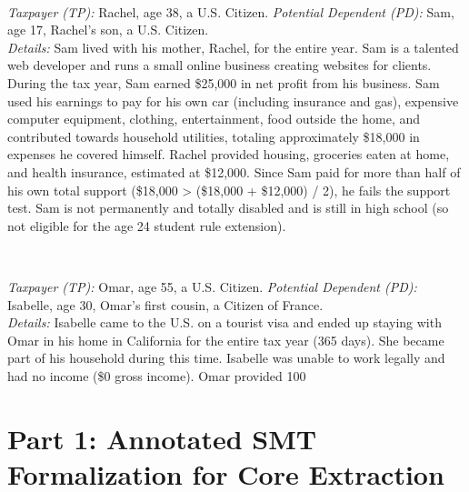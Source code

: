\documentclass[11pt, letterpaper]{article}
\begin{document}
\begin{description}[style=unboxed, leftmargin=0pt]
    \item[Scenario ND2 (Non-Dependent - Fails QC Support, Fails QR)] \mbox{} \\ \begin{RaggedRight}
    \textit{Taxpayer (TP):} Rachel, age 38, a U.S. Citizen.
    \textit{Potential Dependent (PD):} Sam, age 17, Rachel's son, a U.S. Citizen. \\
    \textit{Details:} Sam lived with his mother, Rachel, for the entire year. Sam is a talented web developer and runs a small online business creating websites for clients. During the tax year, Sam earned \$25,000 in net profit from his business. Sam used his earnings to pay for his own car (including insurance and gas), expensive computer equipment, clothing, entertainment, food outside the home, and contributed towards household utilities, totaling approximately \$18,000 in expenses he covered himself. Rachel provided housing, groceries eaten at home, and health insurance, estimated at \$12,000. Since Sam paid for more than half of his own total support (\$18,000 > (\$18,000 + \$12,000) / 2), he fails the support test. Sam is not permanently and totally disabled and is still in high school (so not eligible for the age 24 student rule extension).
    \end{RaggedRight}

    \item[Scenario ND3 (Non-Dependent - Exception (b)(3) Citizenship)] \mbox{} \\ \begin{RaggedRight}
    \textit{Taxpayer (TP):} Omar, age 55, a U.S. Citizen.
    \textit{Potential Dependent (PD):} Isabelle, age 30, Omar's first cousin, a Citizen of France. \\
    \textit{Details:} Isabelle came to the U.S. on a tourist visa and ended up staying with Omar in his home in California for the entire tax year (365 days). She became part of his household during this time. Isabelle was unable to work legally and had no income (\$0 gross income). Omar provided 100%
    \end{RaggedRight}
\end{description}

\section{Part 1: Annotated SMT Formalization for Core Extraction}
\end{document}

